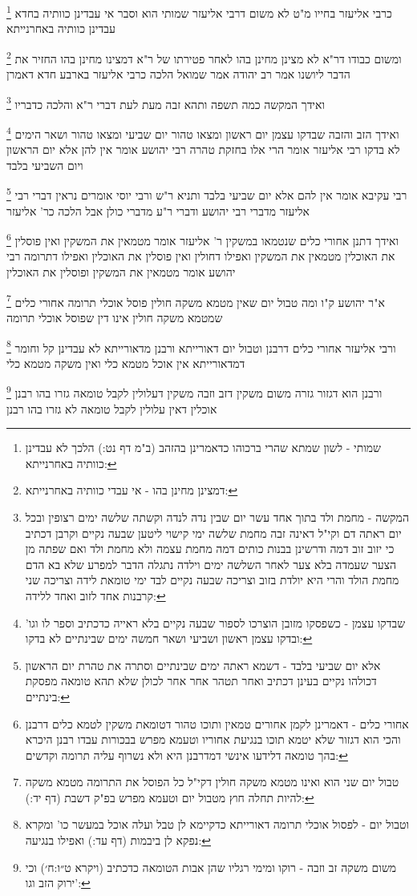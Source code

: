 \documentclass[12pt, openany]{book}
\newcommand{\footnotecomment}[1]{
	\renewcommand\thefootnote{}
	\footnote{#1}}
\newcommand{\commenta}[1]{\footnotecomment{#1}}
\begin{document}
{\commenta{שמותי - לשון שמתא שהרי ברכוהו כדאמרינן בהזהב (ב"מ דף נט:) הלכך לא עבדינן כוותיה באחרנייתא:}
כרבי אליעזר בחייו מ"ט לא משום דרבי אליעזר שמותי הוא וסבר אי עבדינן כוותיה בחדא עבדינן כוותיה באחרנייתא
\commenta{דמצינן מחינן בהו - אי עבדי כוותיה באחרנייתא:}
ומשום כבודו דר"א לא מצינן מחינן בהו לאחר פטירתו של ר"א דמצינו מחינן בהו החזיר את הדבר ליושנו 
אמר רב יהודה אמר שמואל הלכה כרבי אליעזר בארבע חדא דאמרן 
\commenta{המקשה - מחמת ולד בתוך אחד עשר יום שבין נדה לנדה וקשתה שלשה ימים רצופין ובכל יום ראתה דם וקי"ל דאינה זבה מחמת שלשה ימי קישוי ליטען שבעה נקיים וקרבן דכתיב כי יזוב זוב דמה ודרשינן בבנות כותים דמה מחמת עצמה ולא מחמת ולד ואם שפתה מן הצער שעמדה בלא צער לאחר השלשה ימים וילדה נתגלה הדבר למפרע שלא בא הדם מחמת הולד והרי היא יולדת בזוב וצריכה שבעה נקיים לבד ימי טומאת לידה וצריכה שני קרבנות אחד לזוב ואחד ללידה:}
ואידך המקשה כמה תשפה ותהא זבה מעת לעת דברי ר"א והלכה כדבריו 
\commenta{שבדקו עצמן - כשפסקו מזובן הוצרכו לספור שבעה נקיים בלא ראייה כדכתיב וספר לו וגו' ובדקו עצמן ראשון ושביעי ושאר חמשה ימים שבינתיים לא בדקו:}
ואידך הזב והזבה שבדקו עצמן יום ראשון ומצאו טהור יום שביעי ומצאו טהור ושאר הימים לא בדקו רבי אליעזר אומר הרי אלו בחזקת טהרה רבי יהושע אומר אין להן אלא יום הראשון ויום השביעי בלבד 
\commenta{אלא יום שביעי בלבד - דשמא ראתה ימים שבינתיים וסתרה את טהרת יום הראשון דכולהו נקיים בעינן דכתיב ואחר תטהר אחר אחר לכולן שלא תהא טומאה מפסקת בינתיים:}
רבי עקיבא אומר אין להם אלא יום שביעי בלבד ותניא ר"ש ורבי יוסי אומרים נראין דברי רבי אליעזר מדברי רבי יהושע ודברי ר"ע מדברי כולן אבל הלכה כר' אליעזר 
\commenta{אחורי כלים - דאמרינן לקמן אחורים טמאין ותוכו טהור דטומאת משקין לטמא כלים דרבנן והכי הוא דגזור שלא יטמא תוכו בנגיעת אחוריו וטעמא מפרש בבכורות עבדו רבנן היכרא בהך טומאה דלידעו אינשי דמדרבנן היא ולא נשרוף עליה תרומה וקדשים:}
ואידך דתנן אחורי כלים שנטמאו במשקין ר' אליעזר אומר מטמאין את המשקין ואין פוסלין את האוכלין מטמאין את המשקין ואפילו דחולין ואין פוסלין את האוכלין ואפילו דתרומה רבי יהושע אומר מטמאין את המשקין ופוסלין את האוכלין 
\commenta{טבול יום שני הוא ואינו מטמא משקה חולין דקי"ל כל הפוסל את התרומה מטמא משקה להיות תחלה חוץ מטבול יום וטעמא מפרש בפ"ק דשבת (דף יד:):}
א"ר יהושע ק"ו ומה טבול יום שאין מטמא משקה חולין פוסל אוכלי תרומה אחורי כלים שמטמא משקה חולין אינו דין שפוסל אוכלי תרומה 
\commenta{וטבול יום - לפסול אוכלי תרומה דאורייתא כדקיימא לן טבל ועלה אוכל במעשר כו' ומקרא נפקא לן ביבמות (דף עד:) ואפילו בנגיעה:}
ורבי אליעזר אחורי כלים דרבנן וטבול יום דאורייתא ורבנן מדאורייתא לא עבדינן קל וחומר דמדאורייתא אין אוכל מטמא כלי ואין משקה מטמא כלי
\commenta{משום משקה זב וזבה - רוקו ומימי רגליו שהן אבות הטומאה כדכתיב (ויקרא ט״ו:ח׳) וכי ירוק הזב וגו':}
ורבנן הוא דגזור גזרה משום משקין דזב וזבה משקין דעלולין לקבל טומאה גזרו בהו רבנן אוכלין דאין עלולין לקבל טומאה לא גזרו בהו רבנן 
}
\end{document}
